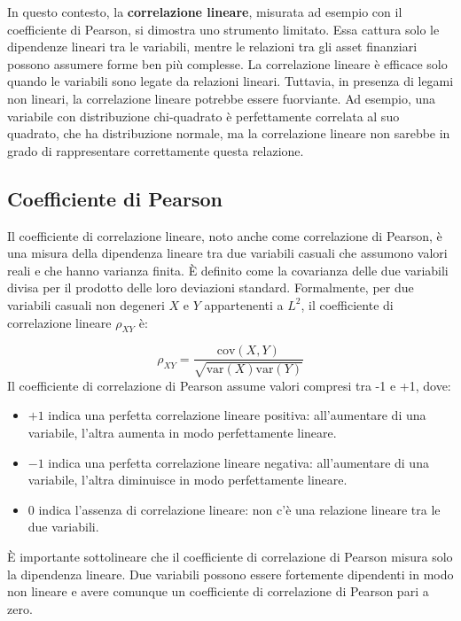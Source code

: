 \documentclass[%
	corpo=11pt,
    twoside,
    stile=classica,
    oldstyle,
    tipotesi=custom,
    greek,
    evenboxes,
]{toptesi}
\begin{document}
In questo contesto, la \textbf{correlazione lineare}, misurata ad esempio con il coefficiente di Pearson, si dimostra uno strumento limitato. Essa cattura solo le dipendenze lineari tra le variabili, mentre le relazioni tra gli asset finanziari possono assumere forme ben più complesse. La correlazione lineare è efficace solo quando le variabili sono legate da relazioni lineari. Tuttavia, in presenza di legami non lineari, la correlazione lineare potrebbe essere fuorviante. Ad esempio, una variabile con distribuzione chi-quadrato è perfettamente correlata al suo quadrato, che ha distribuzione normale, ma la correlazione lineare non sarebbe in grado di rappresentare correttamente questa relazione.

\subsection{Coefficiente di Pearson}

Il coefficiente di correlazione lineare, noto anche come correlazione di Pearson, è una misura della dipendenza lineare tra due variabili casuali che assumono valori reali e che hanno varianza finita. È definito come la covarianza delle due variabili divisa per il prodotto delle loro deviazioni standard. Formalmente, per due variabili casuali non degeneri \( X \) e \( Y \) appartenenti a \( L^2 \), il coefficiente di correlazione lineare \( \rho_{XY} \) è:

\[
\rho_{XY} = \frac{\text{cov}(X,Y)}{\sqrt{\text{var}(X)\text{var}(Y)}}
\]
\newline
Il coefficiente di correlazione di Pearson assume valori compresi tra -1 e +1, dove:
\begin{itemize}
	\item \( +1 \) indica una perfetta correlazione lineare positiva: all’aumentare di una variabile, l’altra aumenta in modo perfettamente lineare.
	\item \( -1 \) indica una perfetta correlazione lineare negativa: all’aumentare di una variabile, l’altra diminuisce in modo perfettamente lineare.
	\item \( 0 \) indica l’assenza di correlazione lineare: non c’è una relazione lineare tra le due variabili.
\end{itemize}

È importante sottolineare che il coefficiente di correlazione di Pearson misura solo la dipendenza lineare. Due variabili possono essere fortemente dipendenti in modo non lineare e avere comunque un coefficiente di correlazione di Pearson pari a zero.
\end{document}

